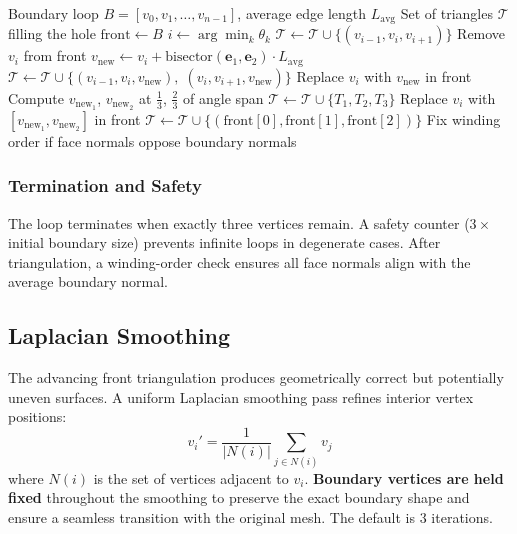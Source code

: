 \documentclass[12pt,a4paper]{article}
\begin{document}
\begin{algorithm}[H]
\caption{Advancing Front Hole Filling}
\begin{algorithmic}[1]
\Require Boundary loop $B = [v_0, v_1, \dots, v_{n-1}]$, average edge length $L_{\text{avg}}$
\Ensure Set of triangles $\mathcal{T}$ filling the hole
\State $\text{front} \gets B$
  \State $i \gets \arg\min_{k} \theta_k$ 
    \State $\mathcal{T} \gets \mathcal{T} \cup \{(v_{i-1}, v_i, v_{i+1})\}$ 
    \State Remove $v_i$ from front
    \State $v_{\text{new}} \gets v_i + \text{bisector}(\mathbf{e}_1, \mathbf{e}_2) \cdot L_{\text{avg}}$ 
    \State $\mathcal{T} \gets \mathcal{T} \cup \{(v_{i-1}, v_i, v_{\text{new}}),\; (v_i, v_{i+1}, v_{\text{new}})\}$
    \State Replace $v_i$ with $v_{\text{new}}$ in front
  \Else
    \State Compute $v_{\text{new}_1}$, $v_{\text{new}_2}$ at $\tfrac{1}{3}$, $\tfrac{2}{3}$ of angle span 
    \State $\mathcal{T} \gets \mathcal{T} \cup \{T_1, T_2, T_3\}$
    \State Replace $v_i$ with $[v_{\text{new}_1}, v_{\text{new}_2}]$ in front
  \EndIf
\EndWhile
\State $\mathcal{T} \gets \mathcal{T} \cup \{(\text{front}[0], \text{front}[1], \text{front}[2])\}$ 
\State Fix winding order if face normals oppose boundary normals
\end{algorithmic}
\end{algorithm}

\subsubsection{Termination and Safety}

The loop terminates when exactly three vertices remain. A safety counter ($3 \times$ initial boundary size) prevents infinite loops in degenerate cases. After triangulation, a winding-order check ensures all face normals align with the average boundary normal.

\subsection{Laplacian Smoothing}

The advancing front triangulation produces geometrically correct but potentially uneven surfaces. A uniform Laplacian smoothing pass refines interior vertex positions:
\begin{equation}
  v_i' = \frac{1}{|N(i)|} \sum_{j \in N(i)} v_j
\end{equation}
where $N(i)$ is the set of vertices adjacent to $v_i$. \textbf{Boundary vertices are held fixed} throughout the smoothing to preserve the exact boundary shape and ensure a seamless transition with the original mesh. The default is 3 iterations.
\end{document}
